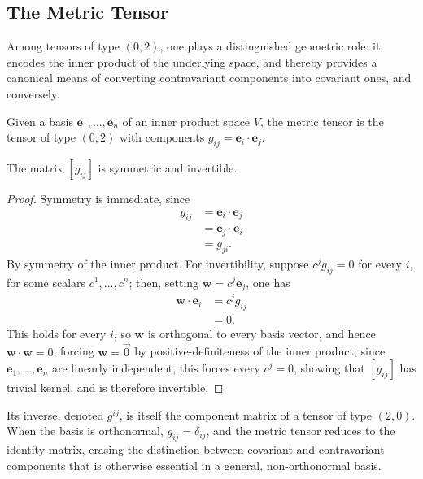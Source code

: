 \subsection{The Metric Tensor}

Among tensors of type $(0,2)$, one plays a distinguished geometric role: it encodes the inner product of the underlying space, and thereby provides a canonical means of converting contravariant components into covariant ones, and conversely.

\begin{definition}
Given a basis $\mathbf{e}_1, \dots, \mathbf{e}_n$ of an inner product space $V$, the metric tensor is the tensor of type $(0,2)$ with components $g_{ij} = \mathbf{e}_i \cdot \mathbf{e}_j$.

\end{definition}

\begin{theorem}
The matrix $[g_{ij}]$ is symmetric and invertible.
\end{theorem}

\begin{proof}
Symmetry is immediate, since
\[
\begin{aligned}
g_{ij} &= \mathbf{e}_i\cdot\mathbf{e}_j \\[0.5em]
&= \mathbf{e}_j\cdot\mathbf{e}_i \\[0.5em]
&= g_{ji}.
\end{aligned}
\]
By symmetry of the inner product. For invertibility, suppose $c^j g_{ij} = 0$ for every $i$, for some scalars $c^1,\dots,c^n$; then, setting $\mathbf{w} = c^j\mathbf{e}_j$, one has
\[
\begin{aligned}
\mathbf{w}\cdot\mathbf{e}_i &= c^jg_{ij} \\[0.5em]
&= 0.
\end{aligned}
\]
This holds for every $i$, so $\mathbf{w}$ is orthogonal to every basis vector, and hence $\mathbf{w}\cdot\mathbf{w} = 0$, forcing $\mathbf{w} = \vec{0}$ by positive-definiteness of the inner product; since $\mathbf{e}_1,\dots,\mathbf{e}_n$ are linearly independent, this forces every $c^j = 0$, showing that $[g_{ij}]$ has trivial kernel, and is therefore invertible.
\end{proof}

Its inverse, denoted $g^{ij}$, is itself the component matrix of a tensor of type $(2,0)$. When the basis is orthonormal, $g_{ij} = \delta_{ij}$, and the metric tensor reduces to the identity matrix, erasing the distinction between covariant and contravariant components that is otherwise essential in a general, non-orthonormal basis.

